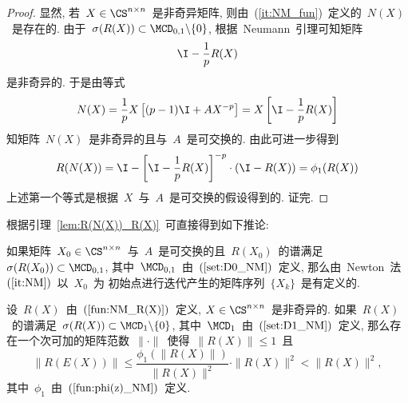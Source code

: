 \begin{proof}

显然, 若~$X \in \CS^{n \times n}$~是非奇异矩阵,
则由~(\ref{it:NM_fun})~定义的~$N(X)$~是存在的. 由于~$\sigma(R(X))
\subset \MCD_{0,1}\backslash\{0\}$, 根据~Neumann~引理可知矩阵
$$
\I - \frac{1}{p} R(X)
$$
是非奇异的. 于是由等式
\begin{align*}
N(X) = \frac{1}{p} X \left[(p - 1)\I + AX^{-p}\right]
 = X \left[\I - \frac{1}{p}R(X)\right]
\end{align*}
%
知矩阵~$N(X)$~是非奇异的且与~$A$~是可交换的. 由此可进一步得到
\begin{equation*}
R(N(X)) = \I - \left[\I - \frac{1}{p} R(X)\right]^{-p}\cdot(\I -
R(X)) = \phi_1(R(X))
\end{equation*}
%
上述第一个等式是根据~$X$~与~$A$~是可交换的假设得到的. 证完.
\end{proof}




根据引理~\ref{lem:R(N(X))_R(X)}~可直接得到如下推论:

\begin{corollary}
\label{cor:N(Xk)} %
%
如果矩阵~$X_0 \in \CS^{n \times
n}$~与~$A$~是可交换的且~$R(X_0)$~的谱满足~$\sigma(R(X_0)) \subset
\MCD_{0,1}$, 其中~$\MCD_{0,1}$~由~$(\ref{set:D0_NM})$~定义,
那么由~Newton~法~$(\ref{it:NM})$~以~$X_0$~为
初始点进行迭代产生的矩阵序列~$\{X_k\}$~是有定义的.
\end{corollary}



\begin{lemma}
\label{lem:norm_R(N(X))_R(X)} %
%
设~$R(X)$~由~$(\ref{fun:NM_R(X)})$~定义, $X \in \CS^{n \times
n}$~是非奇异的. 如果~$R(X)$~的谱满足~$\sigma(R(X)) \subset
\MCD_1\backslash\{0\}$, 其中~$\MCD_1$~由~$(\ref{set:D1_NM})$~定义,
那么存在一个次可加的矩阵范数~$\|\cdot\|$~使得~$\|R(X)\| \leq 1$~且
\begin{equation}
\label{ineq:NM_norm_R(E(X))_1} \|R(E(X))\| \leq
\frac{\phi_1(\|R(X)\|)}{\|R(X)\|^2} \cdot \|R(X)\|^2 < \|R(X)\|^2,
\end{equation}
%
其中~$\phi_1$~由~$(\ref{fun:phi(z)_NM})$~定义.
\end{lemma}

